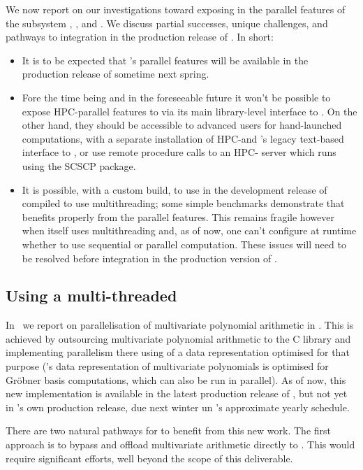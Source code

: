 \documentclass{deliverablereport}
\begin{document}
We now report on our investigations toward exposing in \SageMath the
parallel features of the subsystem \Singular, \GAP, and \Pari. We
discuss partial successes, unique challenges, and pathways to
integration in the production release of \SageMath. In short:
\begin{itemize}
\item It is to be expected that \Singular's parallel features will be
  available in the production release of \Sage sometime next spring.
\item Fore the time being and in the foreseeable future it won't be
  possible to expose HPC-\GAP parallel features to \Sage via its main
  library-level interface to \GAP. On the other hand, they should be
  accessible to advanced users for hand-launched computations, with a
  separate installation of HPC-\GAP and \Sage's legacy text-based
  interface to \GAP, or use remote procedure calls to an HPC-\GAP 
  server which runs using the SCSCP \GAP package.
\item It is possible, with a custom build, to use in \Sage the
  development release of \Pari compiled to use multithreading;
  some simple
  benchmarks demonstrate that \Sage benefits properly from the parallel
  features. This remains fragile however when \Sage itself uses
  multithreading and, as of now, one can't configure at runtime
  whether to use sequential or parallel computation. These issues will
  need to be resolved before integration in the production version of
  \SageMath.
\end{itemize}

\subsection{Using a multi-threaded \Singular}

In~ we report on parallelisation of
multivariate polynomial arithmetic in \Singular. This is achieved by
outsourcing multivariate polynomial arithmetic to the C \FLINT library
and implementing parallelism there using of a data representation
optimised for that purpose (\Singular's data representation of
multivariate polynomials is optimised for Gr\"{o}bner basis
computations, which can also be run in parallel). As of now, this new
implementation is available in the latest production release of
\FLINT, but not yet in \Singular's own production release, due next
winter un \Singular's approximate yearly schedule.

There are two natural pathways for \Sage to benefit from this new
work. The first approach is to bypass \Singular and offload
multivariate arithmetic directly to \FLINT. This would require
significant efforts, well beyond the scope of this deliverable.
\end{document}
